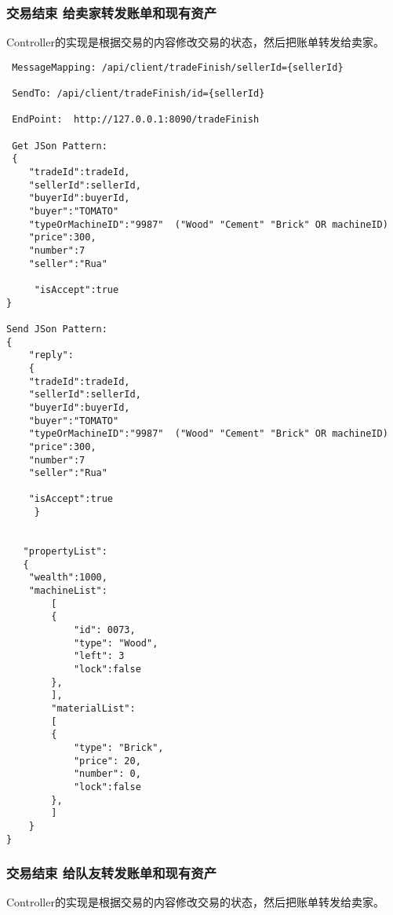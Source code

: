 \documentclass{article}
\begin{document}
				\subsubsection{交易结束 给卖家转发账单和现有资产}

                Controller的实现是根据交易的内容修改交易的状态，然后把账单转发给卖家。

\begin{lstlisting}
 MessageMapping: /api/client/tradeFinish/sellerId={sellerId}

 SendTo: /api/client/tradeFinish/id={sellerId}

 EndPoint:  http://127.0.0.1:8090/tradeFinish

 Get JSon Pattern:
 {
    "tradeId":tradeId,
    "sellerId":sellerId,
    "buyerId":buyerId,
    "buyer":"TOMATO"
    "typeOrMachineID":"9987"  ("Wood" "Cement" "Brick" OR machineID)
    "price":300,
    "number":7
    "seller":"Rua"

     "isAccept":true
}

Send JSon Pattern:
{
    "reply":
    {
    "tradeId":tradeId,
    "sellerId":sellerId,
    "buyerId":buyerId,
    "buyer":"TOMATO"
    "typeOrMachineID":"9987"  ("Wood" "Cement" "Brick" OR machineID)
    "price":300,
    "number":7
    "seller":"Rua"

    "isAccept":true
     }


   "propertyList":
   {
   	"wealth":1000,
   	"machineList":
    	[
        {
            "id": 0073,
            "type": "Wood",
            "left": 3
            "lock":false
        },
        ],
    	"materialList":
    	[
        {
            "type": "Brick",
            "price": 20,
            "number": 0,
            "lock":false
        },
    	]
    }
}
\end{lstlisting}

				\subsubsection{交易结束 给队友转发账单和现有资产}

                Controller的实现是根据交易的内容修改交易的状态，然后把账单转发给卖家。
\end{document}
